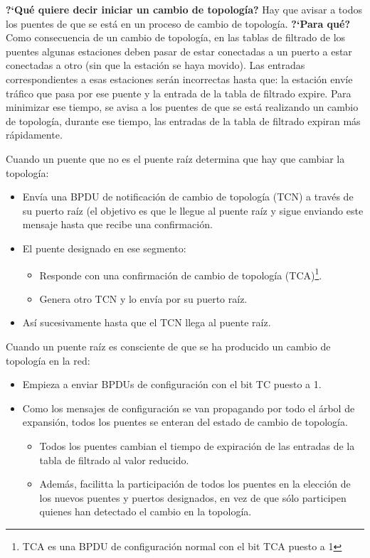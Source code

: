 \documentclass[10pt,portrait, twocolumn]{article}
\begin{document}
\textbf{?`Qué quiere decir iniciar un cambio de topología?} Hay que avisar a todos los puentes de que se está en un proceso de cambio de topología. \textbf{?`Para qué?} Como consecuencia de un cambio de topología, en las tablas de filtrado de los puentes algunas estaciones deben pasar de estar conectadas a un puerto a estar conectadas a otro (sin que la estación se haya movido). Las entradas correspondientes a esas estaciones serán incorrectas hasta que: la estación envíe tráfico que pasa por ese puente y la entrada de la tabla de filtrado expire. Para minimizar ese tiempo, se avisa a los puentes de que se está realizando un cambio de topología, durante ese tiempo, las entradas de la tabla de filtrado expiran más rápidamente.

	\quad Cuando un puente que no es el puente raíz determina que hay que cambiar la topología:
	
		\begin{itemize}
		\item Envía una BPDU de notificación de cambio de topología (TCN) a través de su puerto raíz (el objetivo es que le llegue al puente raíz y sigue enviando este mensaje hasta que recibe una confirmación.
		\item El puente designado en ese segmento:
			\begin{itemize}
			\item Responde con una confirmación de cambio de topología (TCA)\footnote{TCA es una BPDU de configuración normal con el bit TCA puesto a 1}.
			\item Genera otro TCN y lo envía por su puerto raíz.
			\end{itemize}
		\item Así sucesivamente hasta que el TCN llega al puente raíz.
		\end{itemize}

Cuando un puente raíz es consciente de que se ha producido un cambio de topología en la red:
	\begin{itemize}
	\item Empieza a enviar BPDUs de configuración con el bit TC puesto a 1.
	\item Como los mensajes de configuración se van propagando por todo el árbol de expansión, todos los puentes se enteran del estado de cambio de topología.
		\begin{itemize}
		\item Todos los puentes cambian el tiempo de expiración de las entradas de la tabla de filtrado al valor reducido.
		\item Además, facilitta la participación de todos los puentes en la elección de los nuevos puentes y puertos designados, en vez de que sólo participen quienes han detectado el cambio en la topología.
		\end{itemize}
	\end{itemize}
	
\end{document}
